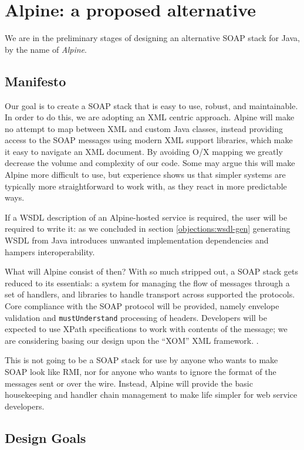 \section{Alpine: a proposed alternative}
\label{alpine}

We are in the preliminary stages of designing an alternative SOAP
stack for Java, by the name of \emph{Alpine}.

\subsection{Manifesto}
\label{alpine:manifesto}

Our goal is to create a SOAP stack that is easy to use, robust, and
maintainable. In order to do this, we are adopting an XML centric
approach. Alpine will make no attempt to map between XML and custom
Java classes, instead providing access to the SOAP messages using
modern XML support libraries, which make it easy to navigate an XML
document. By avoiding O/X mapping we greatly decrease the volume and
complexity of our code. Some may argue this will make Alpine more
difficult to use, but experience shows us that simpler systems are
typically more straightforward to work with, as they react in more
predictable ways.

If a WSDL description of an Alpine-hosted service is required, the
user will be required to write it: as we concluded in section
\ref{objections:wsdl-gen} generating WSDL from Java introduces
unwanted implementation dependencies and hampers interoperability.

What will Alpine consist of then? With so much stripped out, a SOAP
stack gets reduced to its essentials: a system for managing the flow
of messages through a set of handlers, and libraries to handle
transport across supported the protocols. Core compliance with the
SOAP protocol will be provided, namely envelope validation and
\verb|mustUnderstand| processing of headers. Developers will be
expected to use XPath specifications to work with contents of the
message; we are considering basing our design upon the ``XOM'' XML framework.
\cite{harold:xom}.

This is not going to be a SOAP stack
for use by anyone who wants to make SOAP look like RMI, nor for anyone
who wants to ignore the format of the messages sent or over the wire.
Instead, Alpine will provide the basic housekeeping and handler
chain management to make life simpler for web service developers.

\subsection{Design Goals}
\label{alpine:design}

